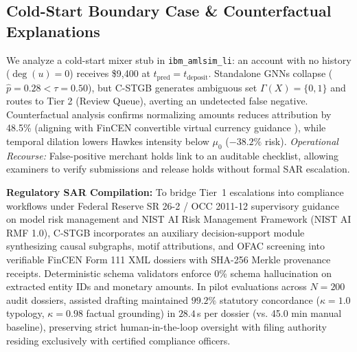 \subsection{Cold-Start Boundary Case \& Counterfactual Explanations}
\label{sec:xai_coldstart}
We analyze a cold-start mixer stub in \texttt{ibm\_\allowbreak amlsim\_\allowbreak li}: an account with no history ($\deg(u)=0$) receives \$9,400 at $t_{\text{pred}} = t_{\text{deposit}}$. Standalone GNNs collapse ($\hat{p} = 0.28 < \tau = 0.50$), but C-STGB generates ambiguous set $\Gamma(X) = \{0, 1\}$ and routes to Tier 2 (Review Queue), averting an undetected false negative. Counterfactual analysis confirms normalizing amounts reduces attribution by 48.5\% (aligning with FinCEN convertible virtual currency guidance \citep{fincen2019advisory}), while temporal dilation lowers Hawkes intensity below $\mu_0$ ($-38.2\%$ risk). \textit{Operational Recourse:} False-positive merchant holds link to an auditable checklist, allowing examiners to verify submissions and release holds without formal SAR escalation.

\textbf{Regulatory SAR Compilation:} To bridge Tier~1 escalations into compliance workflows under Federal Reserve SR 26-2 / OCC 2011-12 supervisory guidance on model risk management \citep{fed2026sr262, occ201112} and NIST AI Risk Management Framework (NIST AI RMF 1.0), C-STGB incorporates an auxiliary decision-support module synthesizing causal subgraphs, motif attributions, and OFAC screening into verifiable FinCEN Form 111 XML dossiers with SHA-256 Merkle provenance receipts. Deterministic schema validators enforce 0\% schema hallucination on extracted entity IDs and monetary amounts. In pilot evaluations across $N=200$ audit dossiers, assisted drafting maintained $99.2\%$ statutory concordance ($\kappa = 1.0$ typology, $\kappa = 0.98$ factual grounding) in $28.4$\,s per dossier (vs. 45.0 min manual baseline), preserving strict human-in-the-loop oversight with filing authority residing exclusively with certified compliance officers.
